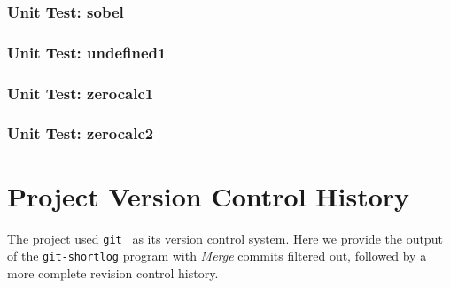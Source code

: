 \subsection*{Unit Test: sobel}

 \clearpage
\subsection*{Unit Test: undefined1}

 \clearpage
\subsection*{Unit Test: zerocalc1}

 \clearpage
\subsection*{Unit Test: zerocalc2}

 \clearpage

\chapter{Project Version Control History}
\label{chap:vcshistory}
The \sys{} project used \texttt{git}~\cite{git:website} as its version control system.
Here we provide the output of the \texttt{git-shortlog} program with \emph{Merge}
commits filtered out, followed by a more complete revision control history.


